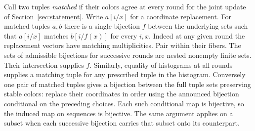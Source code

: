 \documentclass[11pt]{article}
\theoremstyle{definition}
\theoremstyle{remark}
\numberwithin{equation}{section}
\begin{document}
Call two tuples \emph{matched} if their colors agree at every round for
the joint update of Section~\ref{sec:statement}. Write $a[i/x]$ for a
coordinate replacement. For matched tuples $a,b$ there is a single
bijection $f$ between the underlying sets such that
$a[i/x]$ matches $b[i/f(x)]$ for every $i,x$. Indeed at any given round
the replacement vectors have matching multiplicities. Pair within their
fibers. The sets of admissible bijections for successive rounds are
nested nonempty finite sets. Their intersection supplies $f$.
Similarly, equality of histograms at all rounds supplies a matching
tuple for any prescribed tuple in the histogram. Conversely one pair
of matched tuples gives a bijection between the full tuple sets
preserving stable colors: replace their coordinates in order using the
announced bijection conditional on the preceding choices. Each such
conditional map is bijective, so the induced map on sequences is
bijective. The same argument applies on a subset when each successive
bijection carries that subset onto its counterpart.
\end{document}
